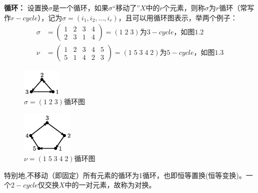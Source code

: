\documentclass[zihao=-4,UTF8]{report}
\begin{document}
\textbf{循环：}
设置换$\sigma$是一个循环，如果$\sigma$``移动了''$X$中的$r$个元素，则称$\sigma $为$r$循环（常写作$r-cycle$），记为$\sigma=(i_{1},i_{2},...,i_{r})$，且可以用循环图表示，举两个例子：
\begin{align*}
    \sigma &= 
    \begin{pmatrix}
        1&  2&  3& 4\\
        2&  3&  1& 4
    \end{pmatrix}=
    \left ( 1\;2\;3\right ) \text{为$3-cycle$，如图1.2}\\
    \nu &= 
    \begin{pmatrix}
        1&  2&  3& 4& 5\\
        5&  1&  4& 2& 3
    \end{pmatrix}=
    \left ( 1\;5\;3\;4\;2\right )\text{为$5-cycle$，如图1.3}
\end{align*}
\begin{minipage}[b]{0.45\columnwidth}
    \begin{figure}[H]
        \centering
        \includegraphics[scale=3]{../pic/循环图1.pdf}
        \vspace{10pt}
        \caption{$\sigma=\left ( 1\;2\;3\right )$循环图}
    \end{figure}
\end{minipage}
\begin{minipage}[b]{0.48\columnwidth}
    \begin{figure}[H]
        \centering
        \includegraphics[scale=3]{../pic/循环图2.pdf}
        \caption{$\nu=\left ( 1\;5\;3\;4\;2\right )$循环图}
      \end{figure}
\end{minipage}



特别地,不移动（即固定）所有元素的循环为1循环，也即恒等置换(恒等变换)。一个$2-cycle$仅交换$X$中的一对元素，故称为对换。
\end{document}
